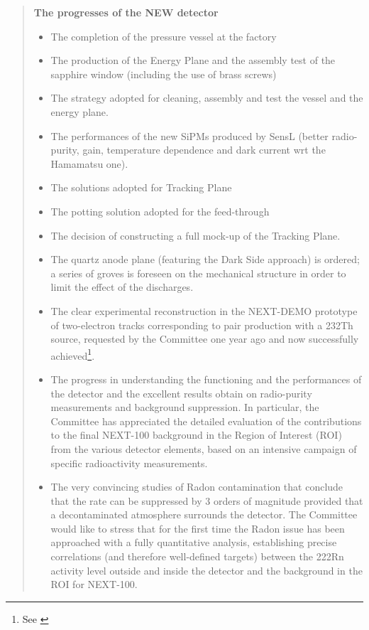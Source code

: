 \begin{quotation}
 
{\bf The progresses of the NEW detector }
  \begin{itemize}
\item The completion of the pressure vessel at the factory 
\item The production of the Energy Plane and the assembly test of the sapphire window (including the use of brass screws)
\item The strategy adopted for cleaning, assembly and test the vessel and the energy plane.
\item The performances of the new SiPMs produced by SensL (better radio-purity, gain, temperature dependence and dark current wrt the Hamamatsu one).
\item The solutions adopted for Tracking Plane
\item The potting solution adopted for the feed-through 
\item The decision of constructing a full mock-up of the Tracking Plane.
\item The quartz anode plane (featuring the Dark Side approach) is ordered; a series of groves is foreseen on the mechanical structure in order to limit the effect of the discharges.
\item The clear experimental reconstruction in the NEXT-DEMO prototype of two-electron tracks corresponding to pair production with a 232Th source, requested by the Committee one year ago and now successfully achieved\footnote{ See \cite{Ferrario:2015kta}}.
\item The progress in understanding the functioning and the performances of the detector and the excellent results obtain on radio-purity measurements and background suppression. In particular, the Committee has appreciated the detailed evaluation of the contributions to the final NEXT-100 background in the Region of Interest (ROI) from the various detector elements, based on an intensive campaign of specific radioactivity measurements. 
\item The very convincing studies of Radon contamination that conclude that the rate can be suppressed by 3 orders of magnitude provided that a decontaminated atmosphere surrounds the detector. The Committee would like to stress that for the first time the Radon issue has been approached with a fully quantitative analysis, establishing precise correlations (and therefore well-defined targets) between the 222Rn activity level outside and inside the detector and the background in the ROI for NEXT-100.
\end{itemize}


\end{quotation}

